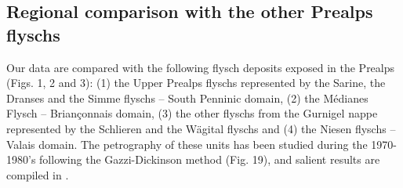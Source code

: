 \documentclass[twoside]{article}
\begin{document}
\subsection{Regional comparison with the other Prealps flyschs}

Our data are compared with the following flysch deposits exposed in the Prealps (Figs. 1, 2 and 3): (1) the Upper Prealps flyschs \citep{Caron1972a,Fluck1973,Gasinski1997} represented by the Sarine, the Dranses and the Simme flyschs – South Penninic domain, (2) the Médianes Flysch \citep{Fluck1973,Caron1989} – Briançonnais domain, (3) the other flyschs from the Gurnigel nappe represented by the Schlieren \citep{Winkler1983,Winkler1984} and the Wägital flyschs \citep{Winkler1985b} and (4) the Niesen flyschs \citep{Ackermann1984,Ackermann1986} – Valais domain. The petrography of these units has been studied during the 1970-1980’s following the Gazzi-Dickinson method (Fig. 19), and salient results are compiled in \cite{Caron1989}.\par
\medskip

\end{document}
